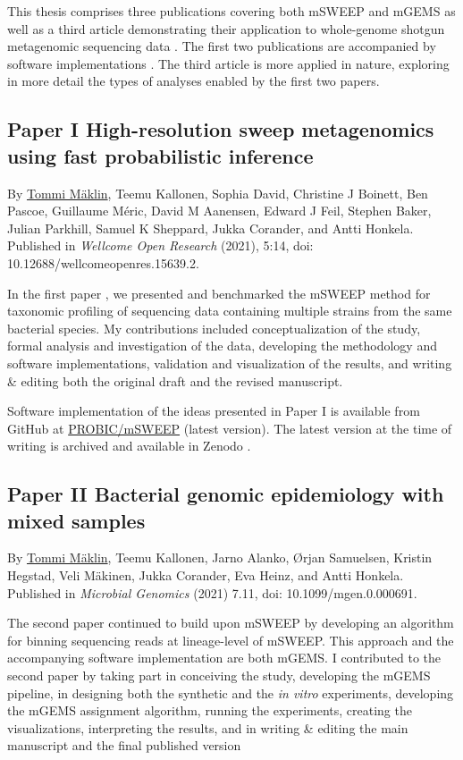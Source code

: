 \documentclass[officiallayout]{tktla}
\begin{document}
This thesis comprises three publications covering both mSWEEP
\citep{maklin_high-resolution_2021} and mGEMS
\citep{maklin_bacterial_2021} as well as a third article demonstrating
their application to whole-genome shotgun metagenomic sequencing data
\citep{maklin_strong_2022}. The first two publications are accompanied
by software implementations \citep{maklin_mSWEEP, maklin_mGEMS}. The
third article is more applied in nature, exploring in more detail the
types of analyses enabled by the first two papers.

\subsection*{Paper I \textemdash{ } High-resolution sweep metagenomics using fast probabilistic inference}
By \underline{Tommi Mäklin}, Teemu Kallonen, Sophia David, Christine J
Boinett, Ben Pascoe, Guillaume Méric, David M Aanensen, Edward J Feil,
Stephen Baker, Julian Parkhill, Samuel K Sheppard, Jukka Corander, and
Antti Honkela. Published in \textit{Wellcome Open Research} (2021),
5:14, doi: 10.12688/wellcomeopenres.15639.2.

In the first paper \citep{maklin_high-resolution_2021}, we presented
and benchmarked the mSWEEP method for taxonomic profiling of
sequencing data containing multiple strains from the same bacterial
species. My contributions included conceptualization of the study,
formal analysis and investigation of the data, developing the
methodology and software implementations, validation and visualization
of the results, and writing \& editing both the original draft and the
revised manuscript.

Software implementation of the ideas presented in Paper I is
available from GitHub at
\href{https://github.com/PROBIC/mSWEEP}{PROBIC/mSWEEP} (latest
version). The latest version at the time of writing is archived and
available in Zenodo \citep{maklin_mSWEEP}.

\subsection*{Paper II \textemdash{ } Bacterial genomic epidemiology with mixed samples}
By \underline{Tommi Mäklin}, Teemu Kallonen, Jarno Alanko, Ørjan
Samuelsen, Kristin Hegstad, Veli Mäkinen, Jukka Corander, Eva Heinz,
and Antti Honkela. Published in \textit{Microbial Genomics} (2021)
7.11, doi: 10.1099/mgen.0.000691.

The second paper \citep{maklin_bacterial_2021} continued to build upon
mSWEEP by developing an algorithm for binning sequencing reads at
lineage-level of mSWEEP. This approach and the accompanying software
implementation are both mGEMS. I contributed to the second paper by
taking part in conceiving the study, developing the mGEMS pipeline, in
designing both the synthetic and the \textit{in vitro} experiments,
developing the mGEMS assignment algorithm, running the experiments,
creating the visualizations, interpreting the results, and in writing
\& editing the main manuscript and the final published version
\end{document}
